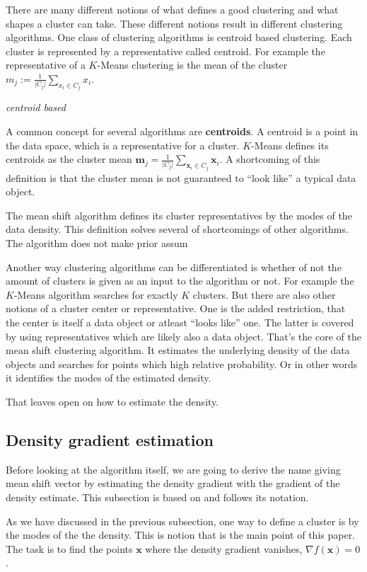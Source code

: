 \documentclass{article}
\begin{document}
There are many different notions of what defines a good clustering and what shapes a cluster can take. These different notions result in different clustering algorithms. One class of clustering algorithms is centroid based clustering. Each cluster is represented by a representative called centroid. For example the representative of a $K$-Means clustering is the mean of the cluster $m_j := \frac{1}{\lvert C_j \rvert} \sum_{x_i \in C_j} x_i$.

\textit{centroid based}

A common concept for several algorithms are \textbf{centroids}. A centroid is a point in the data space, which is a representative for a cluster. $K$-Means defines its centroids as the cluster mean $\bm{m}_j = \frac{1}{\lvert C_j \rvert} \sum_{\bm{x}_i \in C_j} \bm{x}_i$. A shortcoming of this definition is that the cluster mean is not guaranteed to ``look like'' a typical data object.

The mean shift algorithm defines its cluster representatives by the modes of the data density. This definition solves several of shortcomings of other algorithms. The algorithm does not make prior assum


Another way clustering algorithms can be differentiated is whether of not the amount of clusters is given as an input to the algorithm or not. For example the $K$-Means algorithm searches for exactly $K$ clusters. But there are also other notions of a cluster center or representative. One is the added restriction, that the center is itself a data object or atleast ``looks like'' one. The latter is covered by using representatives which are likely also a data object. That's the core of the mean shift clustering algorithm. It estimates the underlying density of the data objects and searches for points which high relative probability. Or in other words it identifies the modes of the estimated density.

That leaves open on how to estimate the density.

\subsection{Density gradient estimation}

Before looking at the algorithm itself, we are going to derive the name giving mean shift vector by estimating the density gradient with the gradient of the density estimate. This subsection is based on \cite{Comaniciu.2002} and follows its notation.

As we have discussed in the previous subsection, one way to define a cluster is by the modes of the the density. This is notion that is the main point of this paper. The task is to find the points $\bm{x}$ where the density gradient vanishes, $\nabla f(\bm{x}) = 0$.
\end{document}
